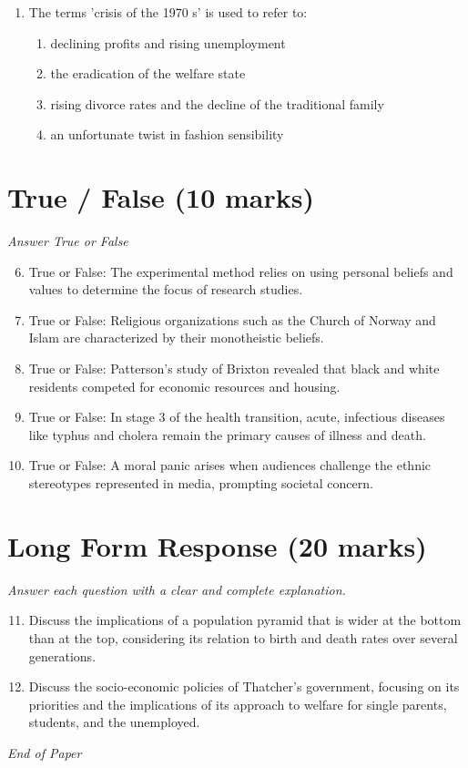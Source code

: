 \documentclass[12pt]{article}
\begin{document}
\begin{enumerate}[label=\arabic*.]
\begin{enumerate}[label=(\alph*)]
    \item shared ideas and moral values, often symbolized by an object or figurehead
    \item ideological tools used to obscure class divisions
\end{enumerate}
\item The terms 'crisis of the 1970 s' is used to refer to:
\begin{enumerate}[label=(\alph*)]
    \item declining profits and rising unemployment
    \item the eradication of the welfare state
    \item rising divorce rates and the decline of the traditional family
    \item an unfortunate twist in fashion sensibility
\end{enumerate}
\end{enumerate}

\section*{True / False (10 marks)}
\textit{Answer True or False}
\begin{enumerate}[label=\arabic*.]
\setcounter{enumi}{5}
\item True or False: The experimental method relies on using personal beliefs and values to determine the focus of research studies.
\item True or False: Religious organizations such as the Church of Norway and Islam are characterized by their monotheistic beliefs.
\item True or False: Patterson's study of Brixton revealed that black and white residents competed for economic resources and housing.
\item True or False: In stage 3 of the health transition, acute, infectious diseases like typhus and cholera remain the primary causes of illness and death.
\item True or False: A moral panic arises when audiences challenge the ethnic stereotypes represented in media, prompting societal concern.
\end{enumerate}

\section*{Long Form Response (20 marks)}
\textit{Answer each question with a clear and complete explanation.}
\begin{enumerate}[label=\arabic*.]
\setcounter{enumi}{10}
\item Discuss the implications of a population pyramid that is wider at the bottom than at the top, considering its relation to birth and death rates over several generations.
\item Discuss the socio-economic policies of Thatcher's government, focusing on its priorities and the implications of its approach to welfare for single parents, students, and the unemployed.
\end{enumerate}

\vfill
\noindent\textit{End of Paper}
\end{document}
